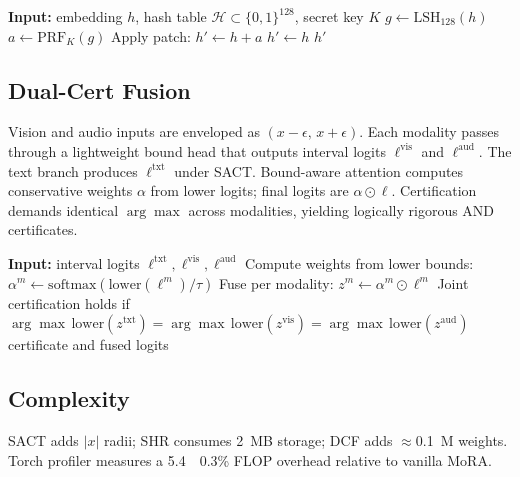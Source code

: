 \documentclass{article}
\begin{document}
\begin{algorithm}[H]
\caption{Secure-Hash Retrieval (inference)}
\begin{algorithmic}
    \State \textbf{Input:} embedding $h$, hash table $\mathcal{H}\subset\{0,1\}^{128}$, secret key $K$
    \State $g \gets \mathrm{LSH}_{128}(h)$
        \State $a \gets \mathrm{PRF}_K(g)$ 
        \State Apply patch: $h' \gets h + a$
    \Else
        \State $h' \gets h$
    \EndIf
    \State \Return $h'$
\end{algorithmic}
\end{algorithm}

\subsection{Dual-Cert Fusion}
Vision and audio inputs are enveloped as $(x-\epsilon,\,x+\epsilon)$. Each modality passes through a lightweight bound head that outputs interval logits $\ell^{\mathrm{vis}}$ and $\ell^{\mathrm{aud}}$. The text branch produces $\ell^{\mathrm{txt}}$ under SACT. Bound-aware attention computes conservative weights $\alpha$ from lower logits; final logits are $\alpha\odot\ell$. Certification demands identical $\arg\max$ across modalities, yielding logically rigorous AND certificates.

\begin{algorithm}[H]
\caption{Dual-Cert Fusion}
\begin{algorithmic}
    \State \textbf{Input:} interval logits $\ell^{\mathrm{txt}},\ell^{\mathrm{vis}},\ell^{\mathrm{aud}}$
        \State Compute weights from lower bounds: $\alpha^m \gets \mathrm{softmax}(\mathrm{lower}(\ell^{m})/\tau)$
        \State Fuse per modality: $z^m \gets \alpha^m \odot \ell^{m}$
    \EndFor
    \State Joint certification holds if $\arg\max\,\mathrm{lower}(z^{\mathrm{txt}})=\arg\max\,\mathrm{lower}(z^{\mathrm{vis}})=\arg\max\,\mathrm{lower}(z^{\mathrm{aud}})$
    \State \Return certificate and fused logits
\end{algorithmic}
\end{algorithm}

\subsection{Complexity}
SACT adds $|x|$ radii; SHR consumes 2~MB storage; DCF adds $\approx$0.1~M weights. Torch profiler measures a 5.4~\textpm~0.3\% FLOP overhead relative to vanilla MoRA.
\end{document}
